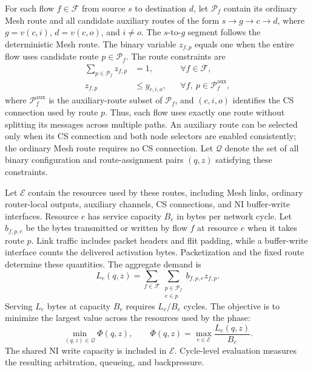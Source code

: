 \documentclass[conference,10pt]{IEEEtran}
\begin{document}
For each flow $f\in\mathcal F$ from source $s$ to destination $d$, let
$\mathcal P_f$ contain its ordinary Mesh route and all candidate auxiliary
routes of the form $s\rightarrow g\rightarrow c\rightarrow d$, where
$g=v(c,i)$, $d=v(c,o)$, and $i\ne o$. The $s$-to-$g$ segment follows the
deterministic Mesh route. The binary variable $z_{f,p}$ equals one when the
entire flow uses candidate route $p\in\mathcal P_f$. The route constraints are
\begin{align}
 \sum_{p\in\mathcal P_f}z_{f,p}&=1, & &\forall f\in\mathcal F,
 \label{eq:noc-flow-route}\\
 z_{f,p}&\leq y_{c,i,o}, & &\forall f,\ p\in\mathcal P_f^{\mathrm{aux}},
 \label{eq:noc-route-match}
\end{align}
where $\mathcal P_f^{\mathrm{aux}}$ is the auxiliary-route subset of
$\mathcal P_f$, and $(c,i,o)$ identifies the CS connection used by route $p$.
Thus, each flow uses exactly one route without splitting its messages across
multiple paths. An auxiliary route can be selected only when its CS connection
and both node selectors are enabled consistently; the ordinary Mesh route
requires no CS connection. Let $\mathcal Q$ denote the set of all binary
configuration and route-assignment pairs $(q,z)$ satisfying these constraints.

Let $\mathcal E$ contain the resources used by these routes, including Mesh
links, ordinary router-local outputs, auxiliary channels, CS connections, and
NI buffer-write interfaces. Resource $e$ has service capacity $B_e$
in bytes per network cycle. Let $b_{f,p,e}$ be the bytes transmitted or written
by flow $f$ at resource $e$ when it takes route $p$. Link traffic includes packet headers
and flit padding, while a buffer-write interface counts the delivered activation
bytes. Packetization and the fixed route determine these quantities. The
aggregate demand is
\begin{equation}
 L_e(q,z)=\sum_{f\in\mathcal F}\sum_{\substack{p\in\mathcal P_f\\e\in p}}
 b_{f,p,e}z_{f,p}.
 \label{eq:noc-resource-demand}
\end{equation}
Serving $L_e$ bytes at capacity $B_e$ requires $L_e/B_e$ cycles. The objective
is to minimize the largest value across the resources used by the phase:
\begin{equation}
 \min_{(q,z)\in\mathcal Q}\Phi(q,z),\qquad
 \Phi(q,z)=\max_{e\in\mathcal E}\frac{L_e(q,z)}{B_e}.
 \label{eq:noc-serialization-demand}
\end{equation}
The shared NI write capacity is included in $\mathcal E$. Cycle-level
evaluation measures the resulting arbitration, queueing, and backpressure.
\end{document}
